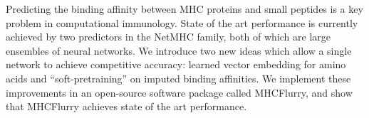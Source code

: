 Predicting the binding affinity between MHC proteins and small peptides is a key problem in computational immunology. State of the art performance is currently achieved by two predictors in the NetMHC family, both of which are large ensembles of neural networks. We introduce two new ideas which allow a single network to achieve competitive accuracy: learned vector embedding for amino acids and ``soft-pretraining'' on imputed binding affinities.  We implement these improvements in an  open-source software package called MHCFlurry, and show that MHCFlurry achieves state of the art performance. 
